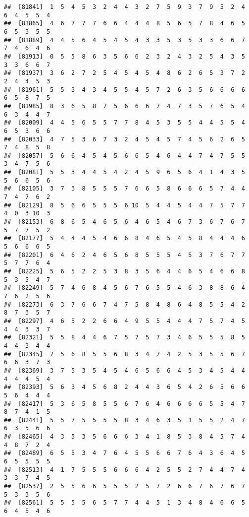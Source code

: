 \documentclass[
]{book}
\begin{document}
\begin{verbatim}
##  [81841]  1  5  4  5  3  2  4  4  3  2  7  5  9  3  7  9  5  2  4  6  4  5  5  4
##  [81865]  4  6  7  7  7  6  6  4  4  4  8  5  6  5  7  8  4  6  5  6  5  3  5  5
##  [81889]  4  4  5  6  4  5  4  5  4  3  3  5  3  5  3  3  6  6  7  7  4  6  4  6
##  [81913]  0  5  5  8  6  3  5  6  6  2  3  2  4  3  2  5  4  3  5  3  3  6  6  7
##  [81937]  3  6  2  7  2  5  4  5  4  5  4  8  6  2  6  5  3  7  2  2  4  4  5  3
##  [81961]  5  5  3  4  3  4  5  5  4  5  7  2  6  3  5  6  6  6  6  6  5  8  7  5
##  [81985]  8  3  6  5  8  7  5  6  6  6  7  4  7  3  5  7  6  5  4  6  3  4  4  7
##  [82009]  4  4  5  6  5  5  7  7  8  4  5  3  5  5  4  4  5  5  4  6  5  3  6  6
##  [82033]  4  7  5  3  6  7  3  2  4  5  4  5  7  4  5  6  2  6  5  7  4  8  5  8
##  [82057]  5  6  6  4  5  4  5  6  6  5  4  6  4  4  7  4  7  5  5  3  4  7  5  6
##  [82081]  5  5  3  4  4  5  4  2  4  5  9  6  5  6  4  1  4  3  5  5  6  6  5  6
##  [82105]  3  7  3  8  5  5  5  7  6  6  5  8  6  6  6  5  7  4  4  7  4  7  6  2
##  [82129]  8  5  6  6  5  5  5  6 10  5  4  4  5  4  4  7  5  7  7  4  0  3 10  3
##  [82153]  6  8  6  5  4  6  5  6  4  6  5  4  6  7  3  6  7  6  7  5  7  7  5  2
##  [82177]  5  4  4  4  5  4  6  6  8  4  6  5  4  5  8  4  4  4  6  5  6  6  6  5
##  [82201]  6  4  6  2  4  6  5  6  8  5  5  5  4  5  3  7  6  7  7  5  7  7  6  4
##  [82225]  5  6  5  2  2  5  3  8  3  5  6  4  4  6  5  4  6  6  8  5  3  5  4  7
##  [82249]  5  7  4  6  8  4  5  6  7  6  5  5  4  6  3  8  8  6  4  7  6  2  5  6
##  [82273]  6  3  7  6  6  7  4  7  5  8  4  8  6  4  8  5  5  4  2  8  7  3  5  7
##  [82297]  4  6  5  2  2  6  6  4  9  5  5  4  4  4  7  5  7  4  5  4  4  3  3  7
##  [82321]  5  5  8  4  4  6  7  5  7  5  7  3  4  6  5  5  5  8  5  4  4  3  4  4
##  [82345]  7  5  6  8  5  5  6  8  3  4  7  4  2  5  3  5  5  6  7  6  6  3  7  3
##  [82369]  3  7  5  3  5  4  5  4  6  5  6  6  4  5  3  4  5  4  4  4  4  4  5  4
##  [82393]  5  6  3  4  5  6  8  2  4  4  3  6  5  4  2  6  5  6  6  5  6  4  4  4
##  [82417]  5  3  6  5  8  5  5  6  7  6  4  6  6  6  6  5  5  4  7  8  7  4  1  5
##  [82441]  5  5  7  5  5  5  5  8  3  4  6  3  5  1  5  5  2  4  7  6  3  5  6  6
##  [82465]  4  3  5  3  5  6  6  6  3  4  1  8  5  3  8  4  5  7  4  4  8  7  2  4
##  [82489]  6  5  5  3  4  7  6  4  5  5  6  6  7  6  4  3  6  4  5  6  5  5  5  5
##  [82513]  4  1  7  5  5  5  6  6  6  4  2  5  5  2  7  4  4  7  4  3  3  7  4  5
##  [82537]  2  5  5  6  6  5  5  5  2  5  7  2  6  6  7  6  7  6  7  5  3  3  5  6
##  [82561]  5  5  5  5  6  5  7  7  4  4  5  1  3  4  8  4  6  6  5  6  4  5  4  6

\end{verbatim}
\end{document}

